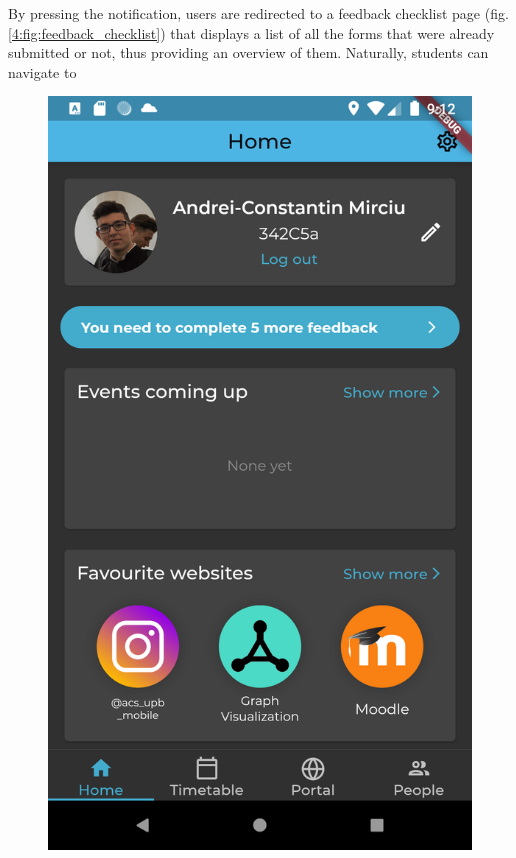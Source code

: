     By pressing the notification, users are redirected to a feedback checklist page (fig. \ref{4:fig:feedback_checklist}) that displays a list of all the forms that were already submitted or not, thus providing an overview of them. Naturally, students can navigate to
    
    \begin{figure}[!ht]
        \centering
        \begin{minipage}[t]{0.315\textwidth}
            \captionsetup{justification=centering}
            \includegraphics[width=\textwidth]{figures/app/final/feedback_nudge.png}

\end{minipage}
\end{figure}
